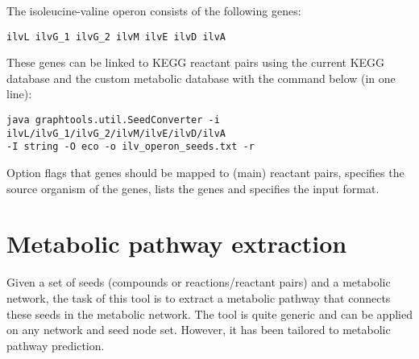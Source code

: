 The isoleucine-valine operon consists of the following genes:

\begin{lstlisting}
ilvL ilvG_1 ilvG_2 ilvM ilvE ilvD ilvA
\end{lstlisting}

These genes can be linked to KEGG reactant pairs using the current KEGG
database and the custom metabolic database with the command below (in one line):

\begin{verbatim}
java graphtools.util.SeedConverter -i ilvL/ilvG_1/ilvG_2/ilvM/ilvE/ilvD/ilvA 
-I string -O eco -o ilv_operon_seeds.txt -r
\end{verbatim}

Option  flags that genes should be mapped to (main) reactant pairs,
 specifies the source organism of the genes,  lists the
genes and  specifies the input format.

\section{Metabolic pathway extraction}

Given a set of seeds (compounds or reactions/reactant pairs) and a metabolic
network, the task of this tool is to extract a metabolic pathway that connects
these seeds in the metabolic network. The tool is quite generic and can be
applied on any network and seed node set. However, it has been tailored to
metabolic pathway prediction.




 
